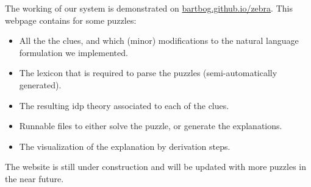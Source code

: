 The working of our system is demonstrated on \url{bartbog.github.io/zebra}. This webpage contains for some puzzles: 
\begin{itemize}
 \item All the the clues, and which (minor) modifications to the natural language formulation we implemented. 
 \item The lexicon that is required to parse the puzzles (semi-automatically generated).
 \item The resulting idp theory associated to each of the clues.
 \item Runnable \idp files to either solve the puzzle, or generate the explanations. 
 \item The visualization of the explanation by derivation steps. 
\end{itemize}
The website is still under construction and will be updated with more puzzles in the near future. 
